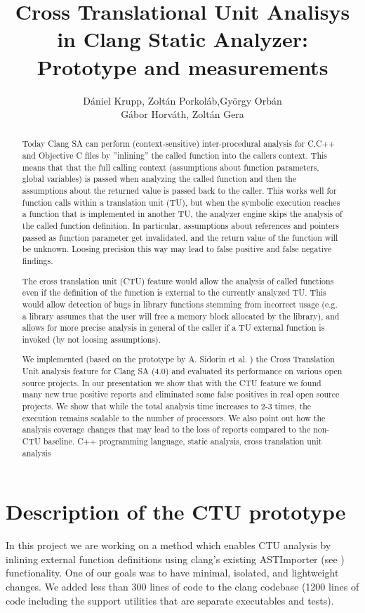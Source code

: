 \documentclass{article}
\title{Cross Translational Unit Analisys in Clang Static Analyzer: Prototype and measurements}
\author{D\'aniel Krupp\inst1, Zolt\'an Porkol\'ab\inst1,Gy\"orgy Orb\'an\inst1\\ 
        G\'abor Horv\'ath\inst2, Zolt\'an Gera\inst2}
\institute{\inst1Ericsson Ltd., \inst2E\"{o}tv\"{o}s Lor\'{a}nd University, Faculty of Informatics\\
             \inst1\url{daniel.krupp@ericsson.com}, 
             \inst1\url{zoltan.porkolab@ericsson.com},
             \inst1\url{gyorgy.orban@ericsson.com},
             \inst2\url{xazax@caesar.elte.hu}, 
             \inst2\url{gerazo@caesar.elte.hu}}
\begin{document}
\maketitle

\begin{abstract}
Today Clang SA can perform (context-sensitive) inter-procedural analysis for 
C,C++ and Objective C files by ''inlining'' 
the called function into the callers context. This means that that the full 
calling context
(assumptions about function parameters, global variables) is passed when 
analyzing the called function and
then the assumptions about the returned value is passed back to the caller. 
This works well for function calls within a
translation unit (TU), but when the symbolic execution reaches a function that 
is implemented in another TU, the analyzer engine 
skips the analysis of the called function definition. In particular,
assumptions about references and pointers passed as function 
parameter get invalidated, and the return value of the function will be unknown.
Loosing precision this way may lead to false positive 
and false negative findings.

The cross translation unit (CTU) feature would allow the analysis of called 
functions even if the definition of the function is external to the currently 
analyzed TU. This would allow detection of bugs in library functions stemming
from incorrect usage (e.g. a library assumes that the user will free a memory 
  block allocated by the library), and allows for more precise analysis in 
general of the caller if a TU external function is invoked 
(by not loosing assumptions).

We implemented (based on the prototype by A. Sidorin et al. \cite{artemctu}) 
the Cross Translation Unit analysis feature for Clang SA (4.0) and evaluated 
its performance on various open source projects. In our presentation we show 
that with the CTU feature we found many new true positive reports and 
eliminated some false positives in real open source projects. We show that 
while the total analysis time increases to 2-3 times, the execution remains
scalable to the number of processors. We also point out how the analysis
coverage changes that may lead to the loss of reports compared to the 
non-CTU baseline.
\keywords C++ programming language, static analysis, cross translation unit analysis
\end{abstract}

\section{Description of the CTU prototype}
In this project we are working on a method which enables CTU analysis 
by inlining external function definitions using clang's existing ASTImporter 
(see \cite{astimporter}) functionality.
One of our goals was to have minimal, isolated, and lightweight changes.
We added less than 300 lines of code to the clang codebase 
(1200 lines of code including the support utilities that are 
  separate executables and tests). 
\end{document}
